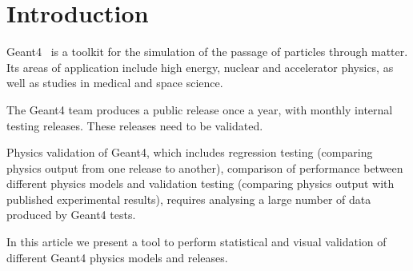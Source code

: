 \section{Introduction}
\label{sec-introduction}
Geant4~\cite{Geant4} is a toolkit for the simulation of the passage of particles through matter. Its areas of application include high energy, nuclear and accelerator physics, as well as studies in medical and space science. 

The Geant4 team produces a public release once a year, with monthly internal testing releases. These releases need to be validated.

Physics validation of Geant4, which includes regression testing (comparing physics output from one release to another), comparison of performance between different physics models and validation testing (comparing physics output with published experimental results), requires analysing a large number of data produced by Geant4 tests. %

In this article we present a tool to perform statistical and visual validation of different Geant4 physics models and releases. %

